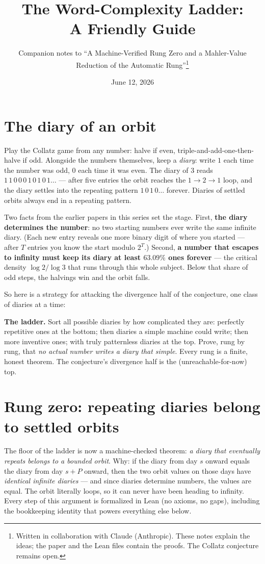 \documentclass[11pt]{article}
\title{The Word-Complexity Ladder:\\
       \Large A Friendly Guide}
\author{Companion notes to ``A Machine-Verified Rung Zero and a
Mahler-Value Reduction of the Automatic Rung''\thanks{Written in
collaboration with Claude (Anthropic). These notes explain the ideas;
the paper and the Lean files contain the proofs. The Collatz
conjecture remains open.}}
\date{June 12, 2026}
\begin{document}
\maketitle

\section{The diary of an orbit}

Play the Collatz game from any number: halve if even,
triple-and-add-one-then-halve if odd. Alongside the numbers
themselves, keep a \emph{diary}: write $1$ each time the number was
odd, $0$ each time it was even. The diary of $3$ reads
$1\,1\,0\,0\,0\,1\,0\,1\,0\,1\ldots$ --- after five entries the orbit
reaches the $1 \to 2 \to 1$ loop, and the diary settles into the
repeating pattern $1\,0\,1\,0\ldots$ forever. Diaries of settled
orbits always end in a repeating pattern.

Two facts from the earlier papers in this series set the stage. First,
\textbf{the diary determines the number}: no two starting numbers ever
write the same infinite diary. (Each new entry reveals one more binary
digit of where you started --- after $T$ entries you know the start
modulo $2^T$.) Second, \textbf{a number that escapes to infinity must
keep its diary at least $63.09\%$ ones forever} --- the critical
density $\log 2/\log 3$ that runs through this whole subject. Below
that share of odd steps, the halvings win and the orbit falls.

So here is a strategy for attacking the divergence half of the
conjecture, one class of diaries at a time:

\begin{keyidea}
\textbf{The ladder.} Sort all possible diaries by how complicated they
are: perfectly repetitive ones at the bottom; then diaries a simple
machine could write; then more inventive ones; with truly patternless
diaries at the top. Prove, rung by rung, that \emph{no actual number
writes a diary that simple}. Every rung is a finite, honest theorem.
The conjecture's divergence half is the (unreachable-for-now) top.
\end{keyidea}

\section{Rung zero: repeating diaries belong to settled orbits}

The floor of the ladder is now a machine-checked theorem: \emph{a
diary that eventually repeats belongs to a bounded orbit}. Why:
if the diary from day $s$ onward equals the diary from day $s+P$
onward, then the two orbit values on those days have \emph{identical
infinite diaries} --- and since diaries determine numbers, the values
are equal. The orbit literally loops, so it can never have been
heading to infinity. Every step of this argument is formalized in
Lean (no axioms, no gaps), including the bookkeeping identity that
powers everything else below.
\end{document}
